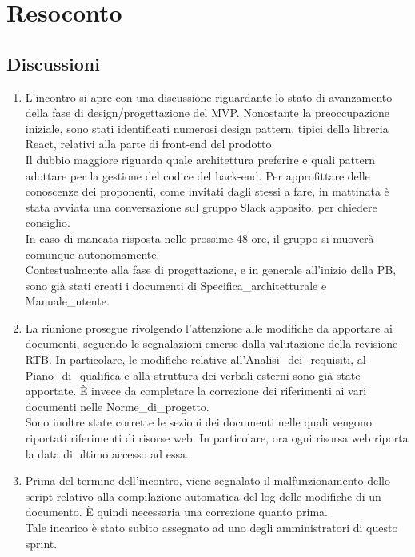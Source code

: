 \section{Resoconto} \label{sec:resoconto}
\subsection{Discussioni} \label{subsec:resdiscussione}
\begin{enumerate}
    \item L'incontro si apre con una discussione riguardante lo stato di avanzamento della fase di design/progettazione del MVP. Nonostante la preoccupazione iniziale, sono stati identificati numerosi design pattern, tipici della libreria React, relativi alla parte di front-end del prodotto.\\
    Il dubbio maggiore riguarda quale architettura preferire e quali pattern adottare per la gestione del codice del back-end. Per approfittare delle conoscenze dei proponenti, come invitati dagli stessi a fare, in mattinata è stata avviata una conversazione sul gruppo Slack apposito, per chiedere consiglio.\\
    In caso di mancata risposta nelle prossime 48 ore, il gruppo si muoverà comunque autonomamente.\\
    Contestualmente alla fase di progettazione, e in generale all'inizio della PB, sono già stati creati i documenti di Specifica\_architetturale e Manuale\_utente.
    \item La riunione prosegue rivolgendo l'attenzione alle modifiche da apportare ai documenti, seguendo le segnalazioni emerse dalla valutazione della revisione RTB. In particolare, le modifiche relative all'Analisi\_dei\_requisiti, al Piano\_di\_qualifica e alla struttura dei verbali esterni sono già state apportate. È invece da completare la correzione dei riferimenti ai vari documenti nelle Norme\_di\_progetto.\\
    Sono inoltre state corrette le sezioni dei documenti nelle quali vengono riportati riferimenti di risorse web. In particolare, ora ogni risorsa web riporta la data di ultimo accesso ad essa.
    \item Prima del termine dell'incontro, viene segnalato il malfunzionamento dello script relativo alla compilazione automatica del log delle modifiche di un documento. È quindi necessaria una correzione quanto prima.\\
    Tale incarico è stato subito assegnato ad uno degli amministratori di questo sprint.
\end{enumerate}

